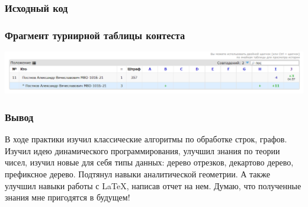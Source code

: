 \subsubsection*{Исходный код}


\subsubsection*{Фрагмент турнирной таблицы контеста}
\begin{center}
\includegraphics[width=\textwidth]{standings/23.png}\newline\noindent
\end{center}

\subsubsection*{Вывод}
В ходе практики изучил классические алгоритмы по обработке строк, графов. Изучил идею динамического программирования, улучшил знания по теории чисел, изучил новые для себя типы данных: дерево отрезков, декартово дерево, префиксное дерево. Подтянул навыки аналитической геометрии. А также улучшил навыки работы с LaTeX, написав отчет на нем. Думаю, что полученные знания мне пригодятся в будущем!

\vspace{20pt}

\pagebreak
